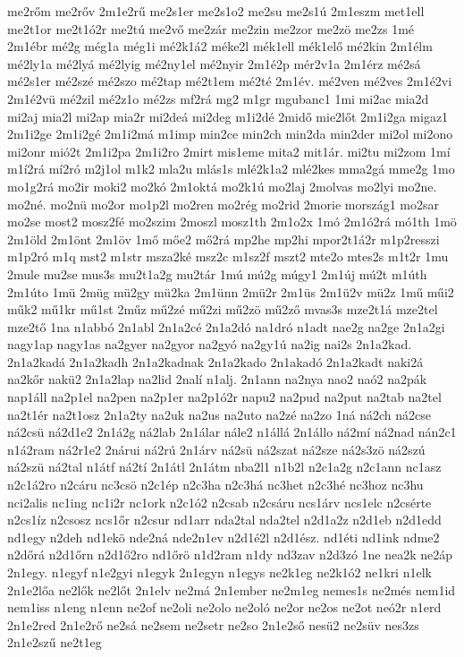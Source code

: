 {me2rőm
me2rőv
2m1e2rű
me2s1er
me2s1o2
me2su
me2s1ú
2m1eszm
met1ell
me2t1or
me2t1ó2r
me2tú
me2vő
me2zár
me2zin
me2zor
me2zö
me2zs
1mé
2m1ébr
mé2g
még1a
még1i
mé2k1á2
méke2l
mék1ell
mék1elő
mé2kin
2m1élm
mé2ly1a
mé2lyá
mé2lyig
mé2ny1el
mé2nyir
2m1é2p
mér2v1a
2m1érz
mé2sá
mé2s1er
mé2szé
mé2szo
mé2tap
mé2t1em
mé2té
2m1év.
mé2ven
mé2ves
2m1é2vi
2m1é2vü
mé2zil
mé2z1o
mé2zs
mf2rá
mg2
m1gr
mgubanc1
1mi
mi2ac
mia2d
mi2aj
mia2l
mi2ap
mia2r
mi2deá
mi2deg
m1i2dé
2midő
mie2lőt
2m1i2ga
migaz1
2m1i2ge
2m1i2gé
2m1i2má
m1imp
min2ce
min2ch
min2da
min2der
mi2ol
mi2ono
mi2onr
mió2t
2m1i2pa
2m1i2ro
2mirt
mis1eme
mita2
mit1ár.
mi2tu
mi2zom
1mí
m1í2rá
mí2ró
m2j1ol
m1k2
mla2u
mlás1s
mlé2k1a2
mlé2kes
mma2gá
mme2g
1mo
mo1g2rá
mo2ir
moki2
mo2kó
2m1oktá
mo2k1ú
mo2laj
2molvas
mo2lyi
mo2ne.
mo2né.
mo2nü
mo2or
mo1p2l
mo2ren
mo2rég
mo2rid
2morie
mország1
mo2sar
mo2se
most2
mosz2fé
mo2szim
2moszl
mosz1th
2m1o2x
1mó
2m1ó2rá
mó1th
1mö
2m1öld
2m1önt
2m1öv
1mő
mőe2
mő2rá
mp2he
mp2hi
mpor2t1á2r
m1p2resszi
m1p2ró
m1q
mst2
m1str
msza2ké
msz2c
m1sz2f
mszt2
mte2o
mtes2s
m1t2r
1mu
2mule
mu2se
mus3s
mu2t1a2g
mu2tár
1mú
mú2g
múgy1
2m1új
mú2t
m1úth
2m1úto
1mü
2müg
mü2gy
mü2ka
2m1ünn
2mü2r
2m1üs
2m1ü2v
mü2z
1mű
műi2
műk2
mű1kr
mű1st
2műz
mű2zé
mű2zi
mű2zö
mű2ző
mvas3s
mze2t1á
mze2tel
mze2tő
1na
n1abbó
2n1abl
2n1a2cé
2n1a2dó
na1dró
n1adt
nae2g
na2ge
2n1a2gi
nagy1ap
nagy1as
na2gyer
na2gyor
na2gyó
na2gy1ú
na2ig
nai2s
2n1a2kad.
2n1a2kadá
2n1a2kadh
2n1a2kadnak
2n1a2kado
2n1akadó
2n1a2kadt
naki2á
na2kőr
nakü2
2n1a2lap
na2lid
2nalí
n1alj.
2n1ann
na2nya
nao2
naó2
na2pák
nap1áll
na2p1el
na2pen
na2p1er
na2p1ó2r
napu2
na2pud
na2put
na2tab
na2tel
na2t1ér
na2t1osz
2n1a2ty
na2uk
na2us
na2uto
na2zé
na2zo
1ná
ná2ch
ná2cse
ná2csü
ná2d1e2
2n1á2g
ná2lab
2n1álar
nále2
n1állá
2n1állo
ná2mí
ná2nad
nán2c1
n1á2ram
ná2r1e2
2nárui
ná2rú
2n1árv
ná2sü
ná2szat
ná2sze
ná2s3zö
ná2szú
ná2szü
ná2tal
n1átf
ná2tí
2n1átl
2n1átm
nba2l1
n1b2l
n2c1a2g
n2c1ann
nc1asz
n2c1á2ro
n2cáru
nc3csö
n2c1ép
n2c3ha
n2c3há
nc3het
n2c3hé
nc3hoz
nc3hu
nci2alis
nc1ing
nc1i2r
nc1ork
n2c1ó2
n2csab
n2csáru
ncs1árv
ncs1elc
n2csérte
n2cs1íz
n2csosz
ncs1őr
n2csur
nd1arr
nda2tal
nda2tel
n2d1a2z
n2d1eb
n2d1edd
nd1egy
n2deh
nd1ekö
nde2ná
nde2n1ev
n2d1é2l
n2d1ész.
nd1éti
nd1ink
ndme2
n2dőrá
n2d1őrn
n2d1ő2ro
nd1őrö
n1d2ram
n1dy
nd3zav
n2d3zó
1ne
nea2k
ne2áp
2n1egy.
n1egyf
n1e2gyi
n1egyk
2n1egyn
n1egys
ne2k1eg
ne2k1ó2
ne1kri
n1elk
2n1e2lőa
ne2lők
ne2lőt
2n1elv
ne2má
2n1ember
ne2m1eg
nemes1s
ne2més
nem1id
nem1iss
n1eng
n1enn
ne2of
ne2oli
ne2olo
ne2oló
ne2or
ne2os
ne2ot
neó2r
n1erd
2n1e2red
2n1e2rő
ne2sá
ne2sem
ne2setr
ne2so
2n1e2ső
nesü2
ne2süv
nes3zs
2n1e2szű
ne2t1eg
}
